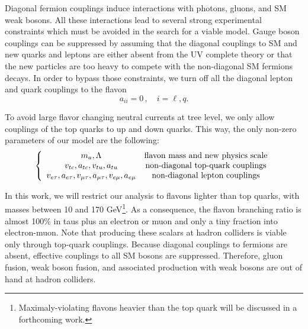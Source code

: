 \documentclass[prd,amsfonts,onecolumn,superscriptaddress,aps,nofootinbib,11pt]{revtex4-1}
\begin{document}
Diagonal fermion couplings induce interactions with photons, gluons, and SM weak bosons. All these interactions lead to several strong experimental constraints which must be avoided in the search for a viable model. Gauge boson couplings can be suppressed by assuming that the diagonal couplings to SM and new quarks and leptons are either absent from the UV complete theory or that the new particles are too heavy to compete with the non-diagonal SM fermions decays. In order to bypass those constraints, we turn off all the diagonal lepton and quark couplings to the flavon %
\begin{equation}
a_{ii} = 0 \,, \quad i=\ell, q.
\end{equation}

To avoid large flavor changing neutral currents at tree level, we only allow couplings of the top quarks to up and down quarks. This way, the only non-zero parameters of our model are the following:
\begin{equation}
\left\{
    \begin{array}{cc}
m_a, \Lambda & \hbox{flavon mass and new physics scale} \\
v_{tc}, a_{tc}, v_{tu}, a_{tu} & \hbox{non-diagonal top-quark couplings} \\
v_{e\tau}, a_{e\tau}, v_{\mu\tau}, a_{\mu\tau}, v_{e\mu}, a_{e\mu} & \hbox{non-diagonal lepton couplings}
    \end{array}
    \right.
\end{equation}

In this work, we will restrict our analysis to flavons lighter than top quarks, with masses between 10 and 170 GeV\footnote{Maximaly-violating flavons heavier than the top quark will be discussed in a forthcoming work.}. As a consequence,  the flavon branching ratio is almost 100\% in taus plus an electron or muon and only a tiny fraction into electron-muon. Note that producing these scalars at hadron colliders is viable only through top-quark couplings. Because diagonal couplings to fermions are absent, effective couplings to all SM bosons are suppressed. Therefore, gluon fusion, weak boson fusion, and associated production with weak bosons are out of hand at hadron colliders.
\end{document}
